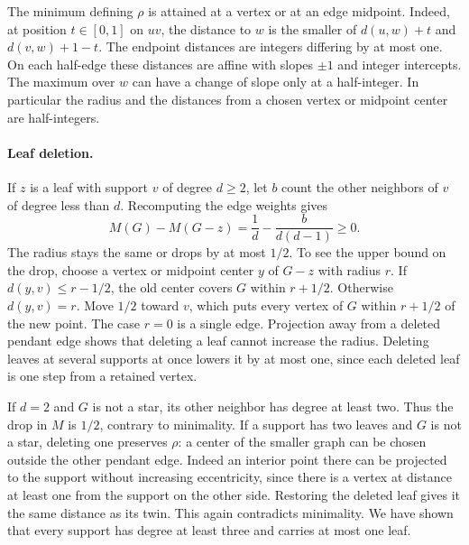 \documentclass[11pt,a4paper]{article}
\begin{document}
The minimum defining $\rho$ is attained at a vertex or at an edge midpoint.
Indeed, at position $t\in[0,1]$ on $uv$, the distance to $w$ is the smaller
of $d(u,w)+t$ and $d(v,w)+1-t$. The endpoint distances are integers
differing by at most one. On each half-edge these distances are affine
with slopes $\pm1$ and integer intercepts. The maximum over $w$ can have
a change of slope only at a half-integer. In particular the radius and
the distances from a chosen vertex or midpoint center are half-integers.

\paragraph{Leaf deletion.}
If $z$ is a leaf with support $v$ of degree $d\ge2$, let $b$ count the
other neighbors of $v$ of degree less than $d$. Recomputing the edge
weights gives
\[
 M(G)-M(G-z)=\frac1d-\frac{b}{d(d-1)}\ge0.
\]
The radius stays the same or drops by at most $1/2$. To see the upper bound
on the drop, choose a vertex or midpoint center $y$ of $G-z$ with radius
$r$. If $d(y,v)\le r-1/2$, the old center covers $G$ within $r+1/2$.
Otherwise $d(y,v)=r$. Move $1/2$ toward $v$, which puts every vertex of
$G$ within $r+1/2$ of the new point. The case $r=0$ is a single edge.
Projection away from a deleted pendant edge shows that deleting a leaf
cannot increase the radius. Deleting leaves at several supports at once
lowers it by at most one, since each deleted leaf is one step from a
retained vertex.

If $d=2$ and $G$ is not a star, its other neighbor has degree at least
two. Thus the drop in $M$ is $1/2$, contrary to minimality. If a support
has two leaves and $G$ is not a star, deleting one preserves $\rho$:
a center of the smaller graph can be chosen outside the other pendant
edge. Indeed an interior point there can be projected to the support
without increasing eccentricity, since there is a vertex at distance
at least one from the support on the other side. Restoring the deleted
leaf gives it the same distance as its twin. This again contradicts
minimality. We have shown that every support has degree at least three
and carries at most one leaf.
\end{document}
